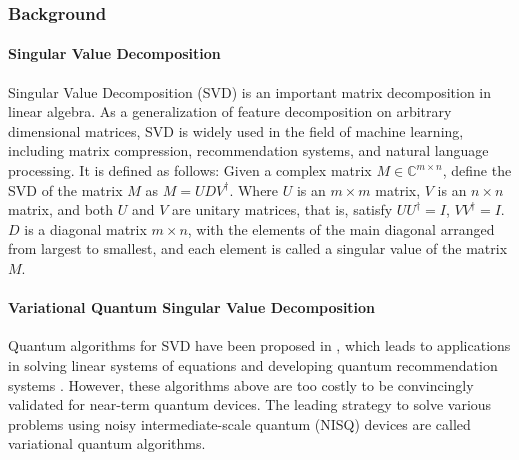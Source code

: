 \subsubsection{Background}
\paragraph{Singular Value Decomposition}
Singular Value Decomposition (SVD) is an important matrix decomposition in linear algebra. As a generalization of feature decomposition on arbitrary dimensional matrices, SVD is widely used in the field of machine learning, including matrix compression, recommendation systems, and natural language processing. It is defined as follows:
Given a complex matrix $M \in \mathbb{C}^{m \times n}$, define the SVD of the matrix $M$ as $M = UDV^\dagger$. Where $U$ is an $m \times m$ matrix, $V$ is an $n \times n$ matrix, and both $U$ and $V$ are unitary matrices, that is, satisfy $UU^\dagger = I$, $VV^\dagger = I$. $D$ is a diagonal matrix $m \times n$, with the elements of the main diagonal arranged from largest to smallest, and each element is called a singular value of the matrix $M$. 

\paragraph{Variational Quantum Singular Value Decomposition}
Quantum algorithms for SVD have been proposed in \cite{kerenidis2016quantum, rebentrost2018quantum}, which leads to applications in solving linear systems of equations \cite{wossnig2018quantum} and developing quantum recommendation systems \cite{kerenidis2016quantum}. However, these algorithms above are too costly to be convincingly validated for near-term quantum devices. The leading strategy to solve various problems using noisy intermediate-scale quantum (NISQ) devices are called variational quantum algorithms. 

